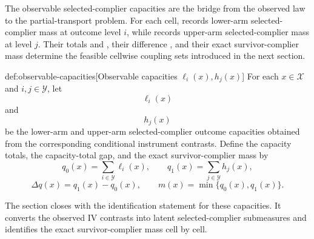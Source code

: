The observable selected-complier capacities are the bridge from the observed law to the partial-transport problem. For each cell,  records lower-arm selected-complier mass at outcome level \(i\), while  records upper-arm selected-complier mass at level \(j\). Their totals  and , their difference , and their exact survivor-complier mass  determine the feasible cellwise coupling sets introduced in the next section.

\begin{definitionv}{def:observable-capacities}[Observable capacities \(\ell_i(x),h_j(x)\)]
For each \(x\in\mathcal X\) and \(i,j\in\mathcal Y\), let
\[
\ell_i(x)
\]
and
\[
h_j(x)
\]
be the lower-arm and upper-arm selected-complier outcome capacities obtained from the corresponding conditional instrument contrasts. Define the capacity totals, the capacity-total gap, and the exact survivor-complier mass by
\[
q_0(x)=\sum_{i\in\mathcal Y}\ell_i(x),
\qquad
q_1(x)=\sum_{j\in\mathcal Y}h_j(x),
\]
\[
\Delta q(x)=q_1(x)-q_0(x),
\qquad
m(x)=\min\{q_0(x),q_1(x)\}.
\]
\end{definitionv}

The section closes with the identification statement for these capacities. It converts the observed IV contrasts into latent selected-complier submeasures and identifies the exact survivor-complier mass cell by cell.

